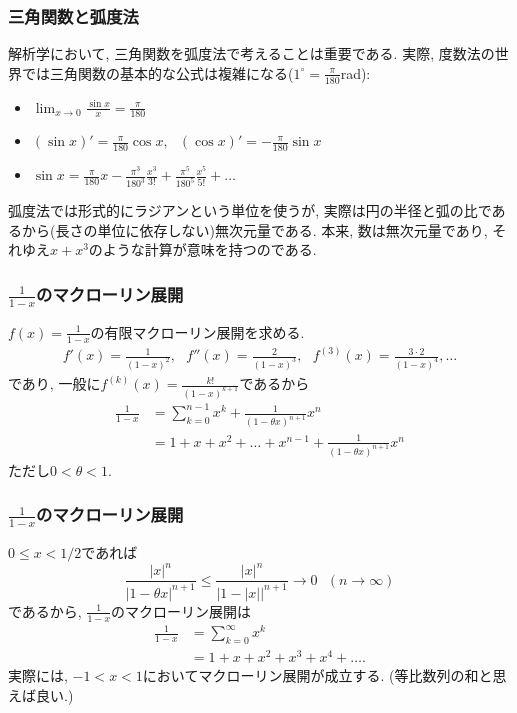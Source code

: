 \begin{frame}
\frametitle{三角関数と弧度法}

解析学において, 三角関数を弧度法で考えることは重要である. 
実際, 度数法の世界では三角関数の基本的な公式は複雑になる($1^\circ=\frac{\pi}{180}$rad):  
\begin{itemize}
\item $\displaystyle \lim_{x\to0}\frac{\sin x}{x}=\frac{\pi}{180}$
\item $\displaystyle (\sin x)'=\frac{\pi}{180} \cos x, \ \ \  (\cos x)'=-\frac{\pi}{180} \sin x$
\item $\displaystyle \sin x = \frac{\pi}{180} x - \frac{\pi^3}{180^3}\frac{x^3}{3!}+\frac{\pi^5}{180^5}\frac{x^5}{5!}+\dots$
\end{itemize}
弧度法では形式的にラジアンという単位を使うが, 実際は円の半径と弧の比であるから(長さの単位に依存しない)無次元量である. 
本来, 数は無次元量であり, それゆえ$x+x^3$のような計算が意味を持つのである. 

\end{frame}





\begin{frame}
\frametitle{$\frac{1}{1-x}$のマクローリン展開}

$f(x)=\frac{1}{1-x}$の有限マクローリン展開を求める. 
\begin{align*}
f'(x)=\frac{1}{(1-x)^2}, \ \ \ f''(x)=\frac{2}{(1-x)^3}, \ \ \  f^{(3)}(x)=\frac{3\cdot 2}{(1-x)^4}, \dots 
\end{align*}
であり, 一般に$f^{(k)}(x)=\frac{k!}{(1-x)^{k+1}}$であるから
\begin{align*}
\frac{1}{1-x} & = \sum_{k=0}^{n-1}x^k+\frac{1}{(1-\theta x)^{n+1}}x^n \\
& = 1+x+x^2+\dots+x^{n-1}+\frac{1}{(1-\theta x)^{n+1}}x^n
\end{align*}
ただし$0<\theta < 1$. 

\end{frame}




\begin{frame}
\frametitle{$\frac{1}{1-x}$のマクローリン展開}

$0\le x<1/2$であれば
$$
\frac{|x|^n}{|1-\theta x|^{n+1}} \le \frac{|x|^n}{|1-|x||^{n+1}} \to 0 \ \ \ (n\to \infty)
$$
であるから, $\frac{1}{1-x}$のマクローリン展開は
\begin{align*}
\frac{1}{1-x} & = \sum_{k=0}^{\infty} x^k \\
&=1+x+x^2+x^3+x^4+\dots. 
\end{align*}
実際には, $-1<x<1$においてマクローリン展開が成立する. 
(等比数列の和と思えば良い.)

\end{frame}



